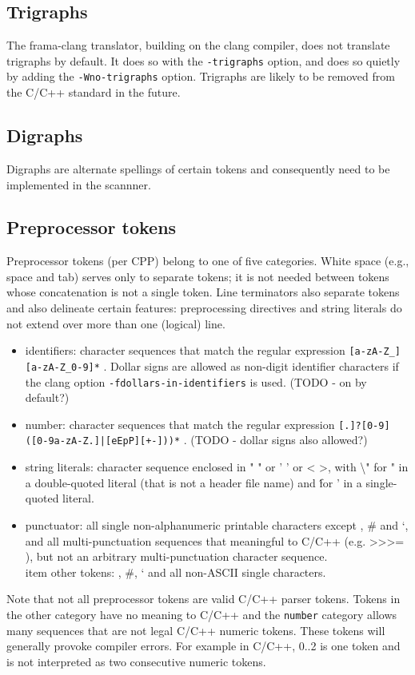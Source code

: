 \subsection{Trigraphs}

The frama-clang translator, building on the clang compiler, does not translate 
trigraphs by default. It does so with the \lstinline|-trigraphs| option, and
does so quietly by adding the \lstinline|-Wno-trigraphs| option.
Trigraphs are likely to be removed from the C/C++ standard in the future.


\subsection{Digraphs}
Digraphs are alternate spellings of certain tokens and consequently need to be
implemented in the scannner. 

\subsection{Preprocessor tokens}
Preprocessor tokens (per CPP) belong to one of five categories. White space (e.g., space and tab) serves only to separate tokens; it is not needed between tokens whose concatenation is not a single token. Line terminators also separate tokens and also delineate certain features: preprocessing directives and string literals do not extend over more than one (logical) line.
\begin{itemize}
	\item identifiers: character sequences that match the regular expression \texttt{[a-zA-Z\_][a-zA-Z\_0-9]*} . Dollar signs are allowed as non-digit identifier characters if the clang option \texttt{-fdollars-in-identifiers} is used. (TODO - on by default?)
	\item number: character sequences that match the regular expression \texttt{[.]?[0-9]([0-9a-zA-Z.]|[eEpP][+-]))*} . (TODO - dollar signs also allowed?)
	\item string literals: character sequence enclosed in " " or ' ' or < >, with \textbackslash " for " in a double-quoted literal (that is not a header file name) and \' for ' in a single-quoted literal.
	\item punctuator: all single non-alphanumeric printable characters except \@, \# and `, and all multi-punctuation sequences that meaningful to C/C++ (e.g. >>>= ), but not an arbitrary multi-punctuation character sequence.
	\\item other tokens: \@, \#, ` and all non-ASCII single characters.
\end{itemize}
Note that not all preprocessor tokens are valid C/C++ parser tokens. Tokens in the other category have no meaning to C/C++ and the \texttt{number} category allows many sequences that are not legal C/C++ numeric tokens. These tokens will generally provoke compiler errors. For example in C/C++, 0..2 is one token and is not interpreted as two consecutive numeric tokens.


